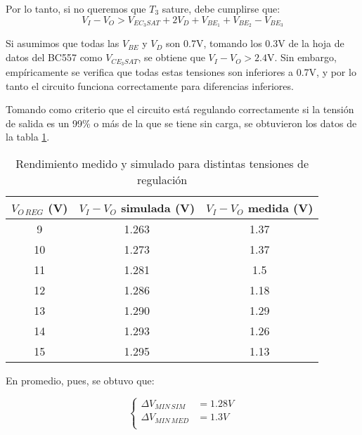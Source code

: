 \documentclass[e2_tp1_main.tex]{subfiles}
\begin{document}
Por lo tanto, si no queremos que $T_3$ sature, debe cumplirse que:
\begin{equation}
	  V_I - V_O > V_{EC_3 SAT} + 2V_D +  V_{BE_1} +  V_{BE_2} -  V_{BE_3}
\end{equation}

Si asumimos que todas las $V_{BE}$ y $V_D$ son 0.7V, tomando los 0.3V de la hoja de datos del BC557 como $V_{CE_3 SAT}$, se obtiene que $V_I - V_O > 2.4$V. Sin embargo, emp\'iricamente se verifica que todas estas tensiones son inferiores a 0.7V, y por lo tanto el circuito funciona correctamente para diferencias inferiores.

Tomando como criterio que el circuito est\'a regulando correctamente si la tensi\'on de salida es un 99\% o m\'as de la que se tiene sin carga, se obtuvieron los datos de la tabla \ref{table:rendimiento}.

\begin{table}[htb!]
\centering
\begin{tabular}{|c||c|c|}
\hline
$V_{O\,REG}$ (V) & $V_I - V_O$ simulada (V) & $V_I - V_O$ medida (V) \\ \hline\hline
9                & 1.263                    & 1.37                   \\ \hline
10               & 1.273                    & 1.37                   \\ \hline
11               & 1.281                    & 1.5                    \\ \hline
12               & 1.286                    & 1.18                   \\ \hline
13               & 1.290                    & 1.29                   \\ \hline
14               & 1.293                    & 1.26                   \\ \hline
15               & 1.295                    & 1.13                   \\ \hline
\end{tabular}
\caption{Rendimiento medido y simulado para distintas tensiones de regulaci\'on}
\label{table:rendimiento}
\end{table}

En promedio, pues, se obtuvo que:

\begin{equation}
	\left\{
	\begin{aligned}
	\Delta V_{MIN\,SIM} &= 1.28V \\ 
	\Delta V_{MIN\,MED} &= 1.3V \\ 
	\end{aligned}
	\right.
\end{equation}
\end{document}
